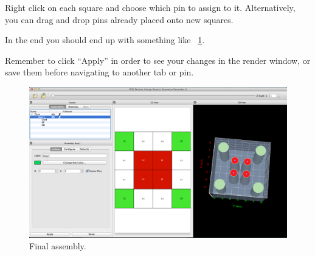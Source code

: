 Right click on each square and choose which pin to assign to it.  Alternatively, you can drag and drop pins already placed onto new squares.

In the end you should end up with something like ~\ref{fig:Rect10}.

Remember to click ``Apply'' in order to see your changes in the render window, or save them before navigating to another tab or pin.

\begin{figure}[htb]
\begin{center}
\includegraphics[width=0.7\linewidth]{Images/rect-final-assy1.png}
\caption{Final assembly.}
\label{fig:Rect10}
\end{center}
\end{figure}

